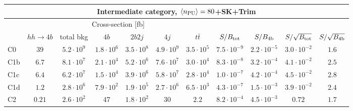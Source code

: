  \begin{tabular}{|l|cc|cccc|cccc|}
  \hline
\multicolumn{11}{|c|}{Intermediate category, $\left\langle n_{\rm PU}\right\rangle=80$+SK+Trim}\\
\hline
&  \multicolumn{6}{c|}{Cross-section [fb]} &  &  & &  \\
   &  $hh\to 4b$ &  total bkg  &   $4b$    &  $2b2j$   &   $4j$    &
$t\bar{t}$ &
$S/B_{\rm tot}$ & $S/B_{\rm 4b}$ & $S/\sqrt{B_{\rm tot}}$ & $S/\sqrt{B_{\rm 4b}}$ \\
  \hline
  \hline
 C0      &  $39$  &   $5.2 \cdot 10^9$   & $1.8 \cdot 10^6$ & $3.5 \cdot 10^8$ & $4.9 \cdot 10^9$ & $3.5 \cdot 10^5$     &    $7.5 \cdot 10^{-9}$   & $2.2 \cdot 10^{-5}$  &   $3.0 \cdot 10^{-2}$   & $1.6 $ \\
 C1b     &  $6.7$  &   $8.1 \cdot 10^7$   & $2.1 \cdot 10^4$ & $5.2 \cdot 10^6$ & $7.6 \cdot 10^7$ & $3.0 \cdot 10^4$     &   $8.3 \cdot 10^{-8}$   & $3.2 \cdot 10^{-4}$   &   $4.1 \cdot 10^{-2}$   & $2.5 $ \\
 C1c     & $6.4 $  &   $6.2 \cdot 10^7 $  & $1.5 \cdot 10^4$ & $3.9 \cdot 10^6$ & $5.8 \cdot 10^7$ & $2.8 \cdot 10^4$     &    $1.0 \cdot 10^{-7}$   & $4.2 \cdot 10^{-4}$  &   $4.5 \cdot 10^{-2}$   & $2.8 $ \\
 C1d     & $1.2 $  &   $2.8 \cdot 10^6$   & $7.9 \cdot 10^2$ & $1.9 \cdot 10^5$ & $2.7 \cdot 10^6$ & $6.5 \cdot 10^3$     &     $4.3 \cdot 10^{-7}$   & $1.5 \cdot 10^{-3}$  &   $3.9 \cdot 10^{-2}$   & $2.4 $ \\
 C2      & $0.21$  &   $2.6 \cdot 10^2$   & $47$ & $1.8 \cdot 10^2$ & $30$ & $2.2 $     &   $  8.2 \cdot 10^{-4}$   & $4.5 \cdot 10^{-3}$  &   $0.72$   & $1.7 $ \\
\hline
\end{tabular}
  $\,$ \\
 \vspace{0.5cm}
